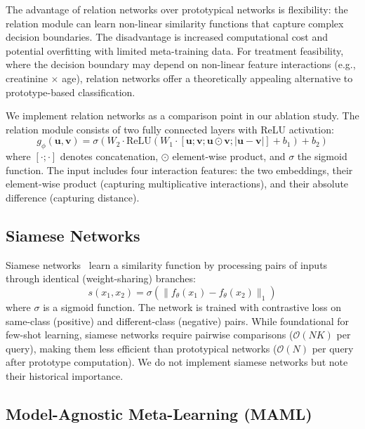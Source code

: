 The advantage of relation networks over prototypical networks is flexibility: the relation module can learn non-linear similarity functions that capture complex decision boundaries. The disadvantage is increased computational cost and potential overfitting with limited meta-training data. For treatment feasibility, where the decision boundary may depend on non-linear feature interactions (e.g., creatinine $\times$ age), relation networks offer a theoretically appealing alternative to prototype-based classification.

We implement relation networks as a comparison point in our ablation study. The relation module consists of two fully connected layers with ReLU activation:
\begin{equation}
g_\phi(\mathbf{u}, \mathbf{v}) = \sigma(W_2 \cdot \text{ReLU}(W_1 \cdot [\mathbf{u}; \mathbf{v}; \mathbf{u} \odot \mathbf{v}; |\mathbf{u} - \mathbf{v}|] + b_1) + b_2)
\end{equation}
where $[\cdot;\cdot]$ denotes concatenation, $\odot$ element-wise product, and $\sigma$ the sigmoid function. The input includes four interaction features: the two embeddings, their element-wise product (capturing multiplicative interactions), and their absolute difference (capturing distance).

\subsection{Siamese Networks}

Siamese networks~\cite{koch2015siamese} learn a similarity function by processing pairs of inputs through identical (weight-sharing) branches:
\begin{equation}
s(x_1, x_2) = \sigma(\|f_\theta(x_1) - f_\theta(x_2)\|_1)
\end{equation}
where $\sigma$ is a sigmoid function. The network is trained with contrastive loss on same-class (positive) and different-class (negative) pairs. While foundational for few-shot learning, siamese networks require pairwise comparisons ($\mathcal{O}(NK)$ per query), making them less efficient than prototypical networks ($\mathcal{O}(N)$ per query after prototype computation). We do not implement siamese networks but note their historical importance.

\subsection{Model-Agnostic Meta-Learning (MAML)}

